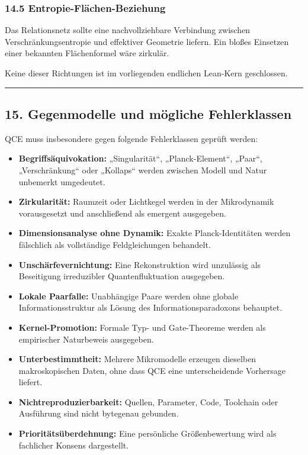 \documentclass[
  11pt,
  a4paper,
]{article}
\providecommand{\tightlist}{%
  \setlength{\itemsep}{0pt}\setlength{\parskip}{0pt}}
\begin{document}
\subsubsection{14.5
Entropie-Flächen-Beziehung}\label{entropie-fluxe4chen-beziehung}

Das Relationsnetz sollte eine nachvollziehbare Verbindung zwischen
Verschränkungsentropie und effektiver Geometrie liefern. Ein bloßes
Einsetzen einer bekannten Flächenformel wäre zirkulär.

Keine dieser Richtungen ist im vorliegenden endlichen Lean-Kern
geschlossen.

\begin{center}\rule{0.5\linewidth}{0.5pt}\end{center}

\subsection{15. Gegenmodelle und mögliche
Fehlerklassen}\label{gegenmodelle-und-muxf6gliche-fehlerklassen}

QCE muss insbesondere gegen folgende Fehlerklassen geprüft werden:

\begin{itemize}
\tightlist
\item
  \textbf{Begriffsäquivokation:} „Singularität``, „Planck-Element``,
  „Paar``, „Verschränkung`` oder „Kollaps`` werden zwischen Modell und
  Natur unbemerkt umgedeutet.
\item
  \textbf{Zirkularität:} Raumzeit oder Lichtkegel werden in der
  Mikrodynamik vorausgesetzt und anschließend als emergent ausgegeben.
\item
  \textbf{Dimensionsanalyse ohne Dynamik:} Exakte Planck-Identitäten
  werden fälschlich als vollständige Feldgleichungen behandelt.
\item
  \textbf{Unschärfevernichtung:} Eine Rekonstruktion wird unzulässig als
  Beseitigung irreduzibler Quantenfluktuation ausgegeben.
\item
  \textbf{Lokale Paarfalle:} Unabhängige Paare werden ohne globale
  Informationsstruktur als Lösung des Informationsparadoxons behauptet.
\item
  \textbf{Kernel-Promotion:} Formale Typ- und Gate-Theoreme werden als
  empirischer Naturbeweis ausgegeben.
\item
  \textbf{Unterbestimmtheit:} Mehrere Mikromodelle erzeugen dieselben
  makroskopischen Daten, ohne dass QCE eine unterscheidende Vorhersage
  liefert.
\item
  \textbf{Nichtreproduzierbarkeit:} Quellen, Parameter, Code, Toolchain
  oder Ausführung sind nicht bytegenau gebunden.
\item
  \textbf{Prioritätsüberdehnung:} Eine persönliche Größenbewertung wird
  als fachlicher Konsens dargestellt.
\end{itemize}
\end{document}
